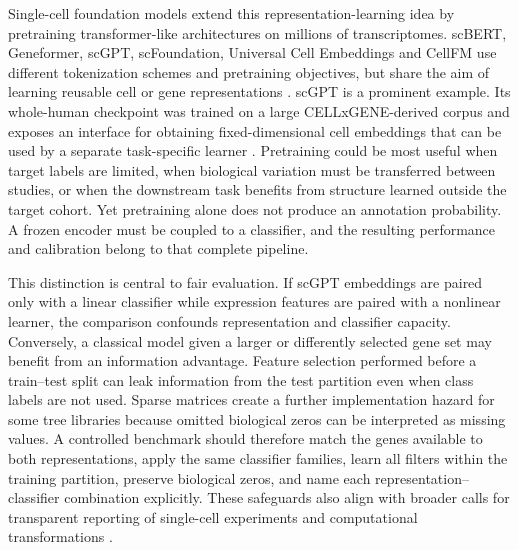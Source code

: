 Single-cell foundation models extend this representation-learning idea by pretraining transformer-like architectures on millions of transcriptomes. scBERT, Geneformer, scGPT, scFoundation, Universal Cell Embeddings and CellFM use different tokenization schemes and pretraining objectives, but share the aim of learning reusable cell or gene representations \citep{Yang2022,Theodoris2023,Cui2024,Hao2024,Rosen2023,CellFM2025,Baek2025}. scGPT is a prominent example. Its whole-human checkpoint was trained on a large CELLxGENE-derived corpus and exposes an interface for obtaining fixed-dimensional cell embeddings that can be used by a separate task-specific learner \citep{Cui2024,CZICELLxGENE2023}. Pretraining could be most useful when target labels are limited, when biological variation must be transferred between studies, or when the downstream task benefits from structure learned outside the target cohort. Yet pretraining alone does not produce an annotation probability. A frozen encoder must be coupled to a classifier, and the resulting performance and calibration belong to that complete pipeline.

This distinction is central to fair evaluation. If scGPT embeddings are paired only with a linear classifier while expression features are paired with a nonlinear learner, the comparison confounds representation and classifier capacity. Conversely, a classical model given a larger or differently selected gene set may benefit from an information advantage. Feature selection performed before a train--test split can leak information from the test partition even when class labels are not used. Sparse matrices create a further implementation hazard for some tree libraries because omitted biological zeros can be interpreted as missing values. A controlled benchmark should therefore match the genes available to both representations, apply the same classifier families, learn all filters within the training partition, preserve biological zeros, and name each representation--classifier combination explicitly. These safeguards also align with broader calls for transparent reporting of single-cell experiments and computational transformations \citep{Fullgrabe2020}.

